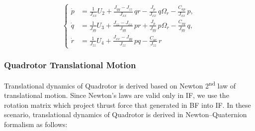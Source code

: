 \begin{equation}
\left\{
\begin{aligned}
\dot{p} &= \frac{1}{J_{xx}} U_2 
        + \frac{J_{yy}-J_{zz}}{J_{xx}}\, q r
        - \frac{J_p}{J_{xx}}\, q \Omega_r
        - \frac{C_{ap}}{J_{xx}}\, p, \\[6pt]
\dot{q} &= \frac{1}{J_{yy}} U_3
        + \frac{J_{zz}-J_{xx}}{J_{yy}}\, p r
        + \frac{J_p}{J_{yy}}\, p \Omega_r
        - \frac{C_{aq}}{J_{yy}}\, q, \\[6pt]
\dot{r} &= \frac{1}{J_{zz}} U_4
        + \frac{J_{xx}-J_{yy}}{J_{zz}}\, p q
        - \frac{C_{ar}}{J_{zz}}\, r
\end{aligned}
\right.
\end{equation}



\subsubsection{Quadrotor Translational Motion}


Translational dynamics of Quadrotor is derived based on Newton 2\textsuperscript{nd} law of translational
motion. Since Newton’s laws are valid only in IF, we use the rotation matrix which project thrust
force that generated in BF into IF. In these scenario, translational dynamics of Quadrotor is derived
in  Newton–Quaternion formalism as follows:





